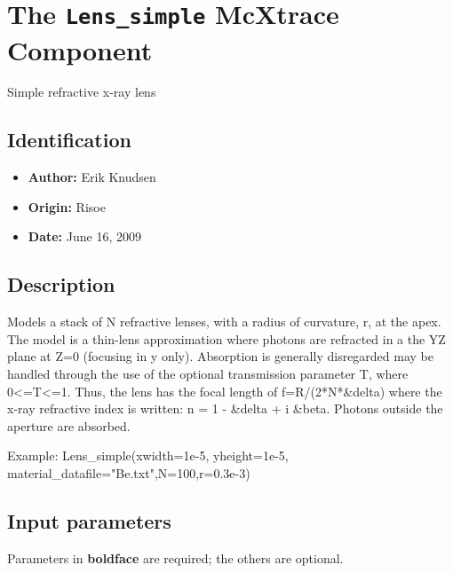 \section{The \texttt{Lens\_simple} McXtrace Component}
Simple refractive x-ray lens

\subsection*{Identification}
\begin{itemize}
  \item \textbf{Author:} Erik Knudsen
  \item \textbf{Origin:} Risoe
  \item \textbf{Date:} June 16, 2009
\end{itemize}

\subsection*{Description}
Models a stack of N refractive lenses, with a radius of curvature, r, at the apex. The model is a thin-lens approximation where photons are refracted in a the YZ plane at Z=0 (focusing in y only). Absorption is generally disregarded may be handled through the use of the optional transmission parameter T, where 0\textless{}=T\textless{}=1. Thus, the lens has the focal length of f=R/(2*N*\&delta) where the x-ray refractive index is written: n = 1 - \&delta + i \&beta. Photons outside the aperture are absorbed.

Example: Lens\_simple(xwidth=1e-5, yheight=1e-5, material\_datafile="Be.txt",N=100,r=0.3e-3)

\subsection*{Input parameters}
Parameters in \textbf{boldface} are required; the others are optional.


